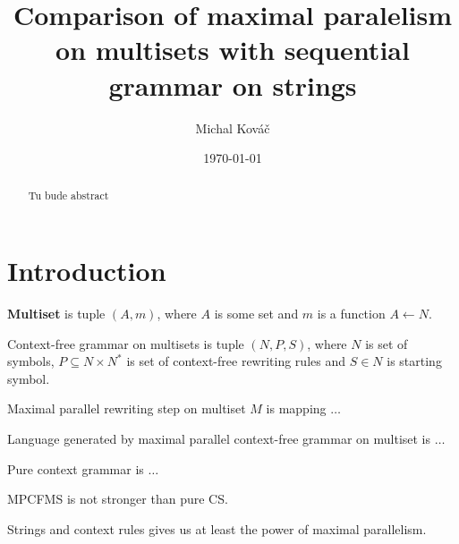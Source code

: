 \documentclass[a4paper,10pt]{article}
\begin{document}
\title{Comparison of maximal paralelism on multisets with sequential grammar on strings}
\author{Michal Kováč}
\date{\today}
\maketitle

\begin{abstract}
Tu bude abstract
\end{abstract}

\section{Introduction}
\begin{definicia}
  {\bf Multiset} is tuple $(A,m)$, where $A$ is some set and $m$ is a function $A\leftarrow N$.
\end{definicia}

\begin{definicia}
  Context-free grammar on multisets is tuple $(N,P,S)$, where $N$ is set of symbols, $P\subseteq N\times N^*$ is set of context-free rewriting rules and $S\in N$ is starting symbol.
\end{definicia}

\begin{definicia}
  Maximal parallel rewriting step on multiset $M$ is mapping $\dots$
\end{definicia}

\begin{definicia}
  Language generated by maximal parallel context-free grammar on multiset is $\dots$
\end{definicia}

\begin{definicia}
  Pure context grammar is $\dots$
\end{definicia}

\begin{veta}
  MPCFMS is not stronger than pure CS.
\end{veta}

\begin{dokaz}
 
\end{dokaz}

\begin{poznamka}
  Strings and context rules gives us at least the power of maximal parallelism.
\end{poznamka}

\begin{thebibliography}{1}
\end{thebibliography}
\end{document}
